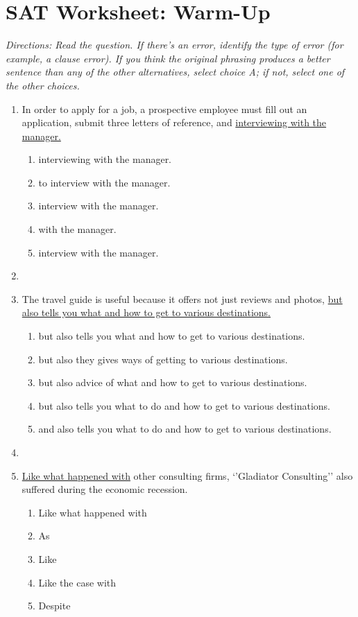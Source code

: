\section{SAT Worksheet: Warm-Up}

\textit{Directions: Read the question. If there's an error, identify the type of error (for example, a clause error). If you think the original phrasing produces a better sentence than any of the other alternatives, select choice A; if not, select one of the other choices.}

\begin{enumerate}

\item In order to apply for a job, a prospective employee must fill out an application, submit three letters of reference, and \ul{interviewing with the manager.}

\begin{enumerate}[label=(\Alph*)]
\item interviewing with the manager. 
\item to interview with the manager.
\item interview with the manager.
\item with the manager.
\item interview with the manager.
\end{enumerate}

\vfill\item 

\item The travel guide is useful because it offers not just reviews and photos, \ul{but also tells you what and how to get to various destinations.}
\begin{enumerate}[label=(\Alph*)]
\item but also tells you what and how to get to various destinations.
\item but also they gives ways of getting to various destinations.
\item but also advice of what and how to get to various destinations.
\item but also tells you what to do and how to get to various destinations.
\item and also tells you what to do and how to get to various destinations.
\end{enumerate}

\vfill\item


\item \underline{Like what happened with} other consulting firms, `'Gladiator Consulting'' also suffered during the economic recession.
\begin{enumerate}[label=(\Alph*)]
\item Like what happened with
\item As
\item Like
\item Like the case with
\item Despite
\end{enumerate}

\end{enumerate} 